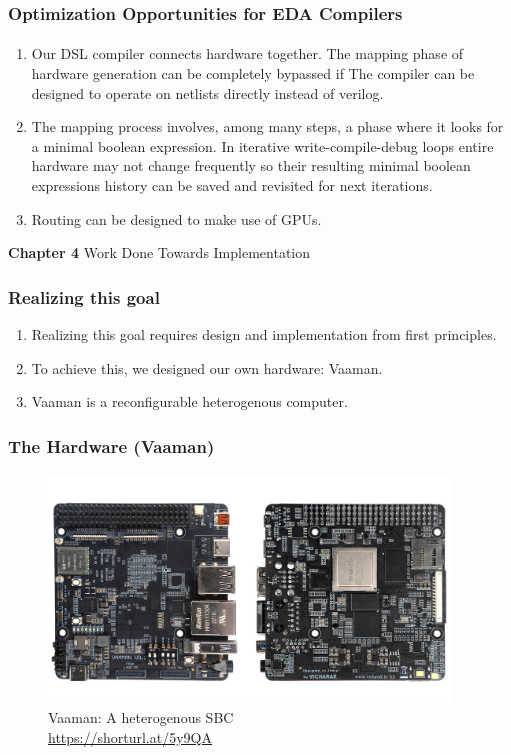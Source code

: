 \documentclass{beamer}
\begin{document}
{\begin{frame}[fragile]
  \frametitle{Optimization Opportunities for EDA Compilers}
  \framesubtitle{}
  \begin{enumerate}
    \item Our DSL compiler connects hardware together. The mapping phase
      of hardware generation can be completely bypassed if The compiler can
      be designed to operate on netlists directly instead of verilog.
    \item The mapping process involves, among many steps, a phase where it looks
      for a minimal boolean expression. In iterative write-compile-debug loops
      entire hardware may not change frequently so their resulting minimal
      boolean expressions history can be saved and revisited for next
      iterations.
    \item Routing can be designed to make use of GPUs.
  \end{enumerate}
\end{frame}

\begin{frame}[c,fragile]

  \centering
  \textbf{Chapter 4}
  Work Done Towards Implementation
\end{frame}

\begin{frame}[fragile]
  \frametitle{Realizing this goal}
  \begin{enumerate}
    \item Realizing this goal requires design and implementation from
      first principles.
    \item To achieve this, we designed our own hardware: Vaaman. 
    \item Vaaman is a reconfigurable heterogenous computer.
  \end{enumerate}
  \framesubtitle{}
\end{frame}

\begin{frame}[fragile]
  \frametitle{The Hardware (Vaaman)}
  \framesubtitle{}
  \begin{figure}
    \centering
    \includegraphics[width=0.95\textwidth]{vaaman.jpg}
    \caption{Vaaman: A heterogenous SBC \\ \url{https://shorturl.at/5y9QA}}
    \label{neuron}
  \end{figure}
  

\end{frame}}
\end{document}
